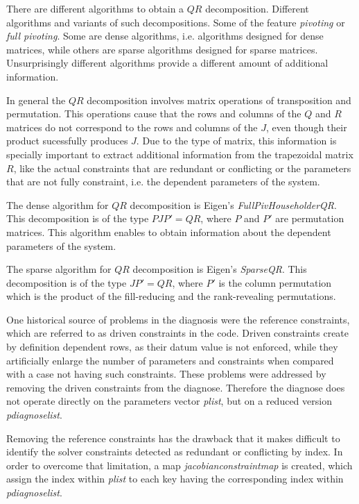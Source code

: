 \documentclass[12pt,twoside,a4paper]{book}
\begin{document}
    There are different algorithms to obtain a $QR$ decomposition. Different algorithms and variants of such decompositions. Some of the feature \emph{pivoting} or \emph{full pivoting}. Some are dense algorithms, i.e. algorithms designed for dense matrices, while others are sparse algorithms designed for sparse matrices. Unsurprisingly different algorithms provide a different amount of additional information.

    In general the $QR$ decomposition involves matrix operations of transposition and permutation. This operations cause that the rows and columns of the $Q$ and $R$ matrices do not correspond to the rows and columns of the $J$, even though their product sucessfully produces $J$. Due to the type of matrix, this information is specially important to extract additional information from the trapezoidal matrix $R$, like the actual constraints that are redundant or conflicting or the parameters that are not fully constraint, i.e. the dependent parameters of the system.

    The dense algorithm for $QR$ decomposition is Eigen's \emph{FullPivHouseholderQR}. This decomposition is of the type $PJP'=QR$, where $P$ and $P'$ are permutation matrices. This algorithm enables to obtain information about the dependent parameters of the system.

    The sparse algorithm for $QR$ decomposition is Eigen's \emph{SparseQR}. This decomposition is of the type $JP'=QR$, where $P'$ is the column permutation which is the product of the fill-reducing and the rank-revealing permutations.

    One historical source of problems in the diagnosis were the reference constraints, which are referred to as driven constraints in the code. Driven constraints create by definition dependent rows, as their datum value is not enforced, while they artificially enlarge the number of parameters and constraints when compared with a case not having such constraints. These problems were addressed by removing the driven constraints from the diagnose. Therefore the diagnose does not operate directly on the parameters vector \emph{plist}, but on a reduced version \emph{pdiagnoselist}.

    Removing the reference constraints has the drawback that it makes difficult to identify the solver constraints detected as redundant or conflicting by index. In order to overcome that limitation, a map \emph{jacobianconstraintmap} is created, which assign the index within \emph{plist} to each key having the corresponding index within \emph{pdiagnoselist}.
\end{document}
